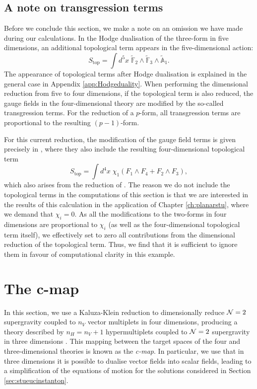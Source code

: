 \subsection*{A note on transgression terms}

Before we conclude this section, we make a note on an omission we have made during our calculations. In the Hodge dualisation of the three-form in five dimensions, an additional topological term appears in the five-dimensional action:
\begin{equation}
\label{eq:5dtopological}
	S_{\text{top}} = \int d^5x \; \tilde{\mathbb{F}}_2 \wedge \tilde{\mathbb{F}}_3 \wedge \tilde{\mathbb{A}}_1.
\end{equation}
The appearance of topological terms after Hodge dualisation is explained in the general case in Appendix \ref{app:Hodgeduality}. When performing the dimensional reduction from five to four dimensions, if the topological term  is also reduced, the gauge fields in the four-dimensional theory are modified by the so-called transgression terms. For the reduction of a $p$-form, all transgression terms are proportional to the resulting $(p-1)$-form.

For this current reduction, the modification of the gauge field terms is given precisely in \cite{Chong:2004na, Chow:2014cca}, where they also include the resulting four-dimensional topological term
\begin{equation*}
	S_{\text{top}} = \int d^4x \; \chi _1 \left(F_1 \wedge F_4 + F_2 \wedge F_3 \right),
\end{equation*}
which also arises from the reduction of . The reason we do not include the topological terms in the computations of this section is that we are interested in the results of this calculation in the application of Chapter \ref{ch:planarstu}, where we demand that $\chi_i = 0$. As all the modifications to the two-forms in four dimensions are proportional to $\chi_i$ (as well as the four-dimensional topological term itself), we effectively set to zero all contributions from the dimensional reduction of the topological term. Thus, we find that it is sufficient to ignore them in favour of computational clarity in this example.

\section{The c-map}
\label{sec:cmap}

In this section, we use a Kaluza-Klein reduction to dimensionally reduce ${\cal N} = 2$ supergravity coupled to $n_V$ vector multiplets in four dimensions, producing a theory described by $n_H = n_V + 1$ hypermultiplets coupled to ${\cal N} = 2$ supergravity in three dimensions \cite{Ferrara:1989ik}. This mapping between the target spaces of the four and three-dimensional theories is known as the \emph{c-map}. In particular, we use that in three dimensions it is possible to dualise vector fields into scalar fields, leading to a simplification of the equations of motion for the solutions considered in Section \ref{sec:stueucinstanton}. 

